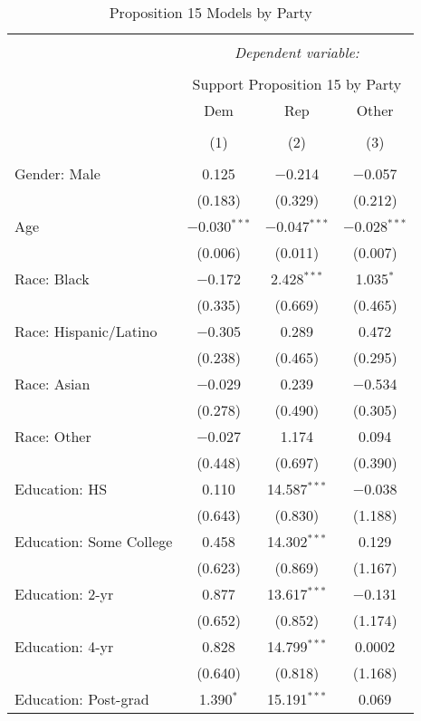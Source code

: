 
\begin{table}[!htbp] \centering 
  \caption{Proposition 15 Models by Party} 
  \label{tab:partisan_prop15_long} 
\footnotesize 
\begin{tabular}{@{\extracolsep{5pt}}lccc} 
\\[-1.8ex]\hline 
\hline \\[-1.8ex] 
 & \multicolumn{3}{c}{\textit{Dependent variable:}} \\ 
\cline{2-4} 
\\[-1.8ex] & \multicolumn{3}{c}{Support Proposition 15 by Party} \\ 
 & Dem & Rep & Other \\ 
\\[-1.8ex] & (1) & (2) & (3)\\ 
\hline \\[-1.8ex] 
 Gender: Male & 0.125 & $-$0.214 & $-$0.057 \\ 
  & (0.183) & (0.329) & (0.212) \\ 
  Age & $-$0.030$^{***}$ & $-$0.047$^{***}$ & $-$0.028$^{***}$ \\ 
  & (0.006) & (0.011) & (0.007) \\ 
  Race: Black & $-$0.172 & 2.428$^{***}$ & 1.035$^{*}$ \\ 
  & (0.335) & (0.669) & (0.465) \\ 
  Race: Hispanic/Latino & $-$0.305 & 0.289 & 0.472 \\ 
  & (0.238) & (0.465) & (0.295) \\ 
  Race: Asian & $-$0.029 & 0.239 & $-$0.534 \\ 
  & (0.278) & (0.490) & (0.305) \\ 
  Race: Other & $-$0.027 & 1.174 & 0.094 \\ 
  & (0.448) & (0.697) & (0.390) \\ 
  Education: HS & 0.110 & 14.587$^{***}$ & $-$0.038 \\ 
  & (0.643) & (0.830) & (1.188) \\ 
  Education: Some College & 0.458 & 14.302$^{***}$ & 0.129 \\ 
  & (0.623) & (0.869) & (1.167) \\ 
  Education: 2-yr & 0.877 & 13.617$^{***}$ & $-$0.131 \\ 
  & (0.652) & (0.852) & (1.174) \\ 
  Education: 4-yr & 0.828 & 14.799$^{***}$ & 0.0002 \\ 
  & (0.640) & (0.818) & (1.168) \\ 
  Education: Post-grad & 1.390$^{*}$ & 15.191$^{***}$ & 0.069 \\ 

\end{tabular}
\end{table}
